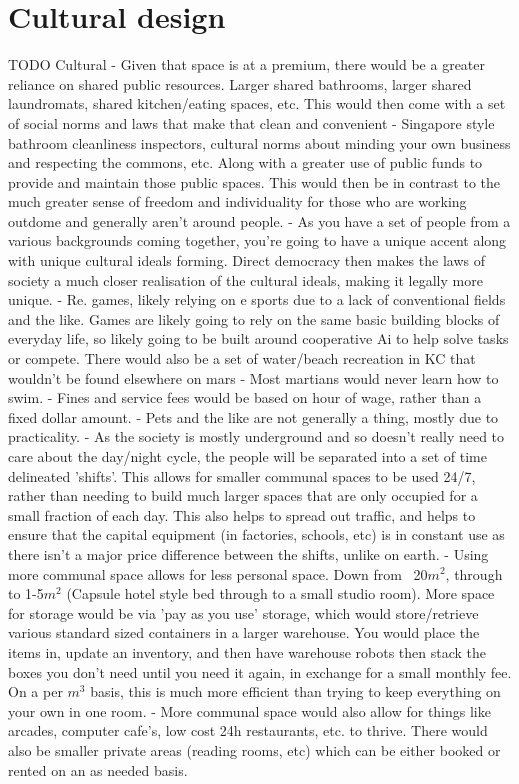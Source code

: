 \documentclass[10pt]{article}
\begin{document}
\section*{Cultural design}
TODO Cultural - Given that space is at a premium, there would be a greater reliance on shared public resources. Larger shared bathrooms, larger shared laundromats, shared kitchen/eating spaces, etc. This would then come with a set of social norms and laws that make that clean and convenient - Singapore style bathroom cleanliness inspectors, cultural norms about minding your own business and respecting the commons, etc. Along with a greater use of public funds to provide and maintain those public spaces. This would then be in contrast to the much greater sense of freedom and individuality for those who are working outdome and generally aren't around people.
- As you have a set of people from a various backgrounds coming together, you're going to have a unique accent along with unique cultural ideals forming. Direct democracy then makes the laws of society a much closer realisation of the cultural ideals, making it legally more unique.
- Re. games, likely relying on e sports due to a lack of conventional fields and the like. Games are likely going to rely on the same basic building blocks of everyday life, so likely going to be built around cooperative Ai to help solve tasks or compete. There would also be a set of water/beach recreation in KC that wouldn't be found elsewhere on mars - Most martians would never learn how to swim.
- Fines and service fees would be based on hour of wage, rather than a fixed dollar amount.
- Pets and the like are not generally a thing, mostly due to practicality.
- As the society is mostly underground and so doesn't really need to care about the day/night cycle, the people will be separated into a set of time delineated 'shifts'. This allows for smaller communal spaces to be used 24/7, rather than needing to build much larger spaces that are only occupied for a small fraction of each day. This also helps to spread out traffic, and helps to ensure that the capital equipment (in factories, schools, etc) is in constant use as there isn't a major price difference between the shifts, unlike on earth.
- Using more communal space allows for less personal space. Down from ~20$m^2$, through to 1-5$m^2$ (Capsule hotel style bed through to a small studio room). More space for storage would be via 'pay as you use' storage, which would store/retrieve various standard sized containers in a larger warehouse. You would place the items in, update an inventory, and then have warehouse robots then stack the boxes you don't need until you need it again, in exchange for a small monthly fee. On a per $m^3$ basis, this is much more efficient than trying to keep everything on your own in one room.
- More communal space would also allow for things like arcades, computer cafe's, low cost 24h restaurants, etc. to thrive. There would also be smaller private areas (reading rooms, etc) which can be either booked or rented on an as needed basis.
\end{document}
